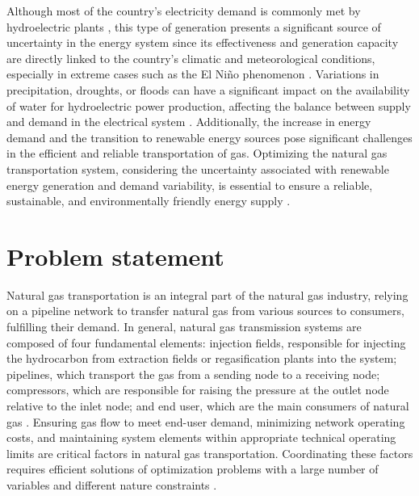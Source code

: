 Although most of the country's electricity demand is commonly met by hydroelectric plants \cite{Arango-Aramburo_Turner_Daenzer_Ríos-Ocampo_Hejazi_Kober_Álvarez-Espinosa_Romero-Otalora_vanderZwaan_2019}, this type of generation presents a significant source of uncertainty in the energy system since its effectiveness and generation capacity are directly linked to the country's climatic and meteorological conditions, especially in extreme cases such as the El Niño phenomenon \cite{Villa-Loaiza_Taype-Huaman_Benavides-Franco_Buenaventura-Vera_Carabalí-Mosquera_2023}. Variations in precipitation, droughts, or floods can have a significant impact on the availability of water for hydroelectric power production, affecting the balance between supply and demand in the electrical system \cite{Ignacio_Fariza_2022}. Additionally, the increase in energy demand and the transition to renewable energy sources pose significant challenges in the efficient and reliable transportation of gas. Optimizing the natural gas transportation system, considering the uncertainty associated with renewable energy generation and demand variability, is essential to ensure a reliable, sustainable, and environmentally friendly energy supply \cite{Shan_Yu_Gong_Huang_Wen_Wang_Ren_Wang_Shi_Liu_2023}.
    




\section{Problem statement}

Natural gas transportation is an integral part of the natural gas industry, relying on a pipeline network to transfer natural gas from various sources to consumers, fulfilling their demand. In general, natural gas transmission systems are composed of four fundamental elements: injection fields, responsible for injecting the hydrocarbon from extraction fields or regasification plants into the system; pipelines, which transport the gas from a sending node to a receiving node; compressors, which are responsible for raising the pressure at the outlet node relative to the inlet node; and end user, which are the main consumers of natural gas \cite{review}. Ensuring gas flow to meet end-user demand, minimizing network operating costs, and maintaining system elements within appropriate technical operating limits are critical factors in natural gas transportation. Coordinating these factors requires efficient solutions of optimization problems with a large number of variables and different nature constraints  \cite{Conejo}.


